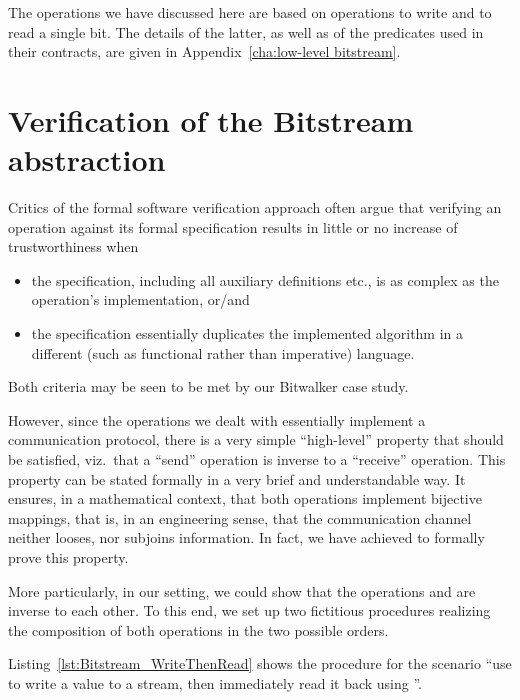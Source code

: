 The operations we have discussed here are based
on operations to write and to read a single bit.
%
The details of the latter, as well as of the predicates used in their
contracts, are given in Appendix~\ref{cha:low-level bitstream}.


\section{Verification of the Bitstream abstraction}
\label{sec:bitstream verif}



Critics of the formal software verification approach often 
argue that verifying an operation against its formal specification
results in little or no increase of trustworthiness when
%
\begin{itemize}
\item the specification, including all auxiliary definitions etc., is
	as complex as the operation's implementation, or/and
\item the specification essentially duplicates the implemented
	algorithm in a different (such as functional rather than
	imperative) language.
\end{itemize}
%
Both criteria may be seen to be met by our Bitwalker case study.



However, since the operations we dealt with essentially implement a
communication protocol, there is a very simple ``high-level'' property
that should be satisfied, viz.\ that a ``send'' operation is inverse
to a ``receive'' operation.
%
This property can be stated formally in a very brief and understandable
way.
%
It ensures, in a mathematical context, that both operations implement
bijective mappings, that is, in an engineering sense, that the
communication channel neither looses, nor subjoins information.
%
In fact, we have achieved to formally prove this property.




More particularly, in our setting, we could show that the operations
 and  are
inverse to each other.
%
To this end, we set up two fictitious  procedures realizing
the composition of both operations in the two possible orders.




Listing~\ref{lst:Bitstream_WriteThenRead}
shows the procedure for the scenario ``use 
to write a value to a stream, then immediately read it back using
''.


